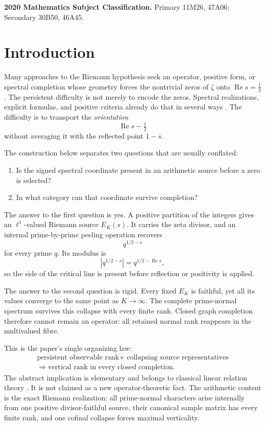 \documentclass[11pt]{article}
\theoremstyle{definition}
\theoremstyle{remark}
\newcommand{\Rea}{\operatorname{Re}}
\begin{document}
\medskip
\noindent\textbf{2020 Mathematics Subject Classification.}
Primary 11M26, 47A06; Secondary 30B50, 46A45.

\section{Introduction}

Many approaches to the Riemann hypothesis seek an operator, positive form, or
spectral completion whose geometry forces the nontrivial zeros of
\(\zeta\) onto \(\Rea s=\tfrac12\).  The persistent difficulty is not merely
to encode the zeros.  Spectral realizations, explicit formulas, and positive
criteria already do that in several ways
\cite{Connes1999,Meyer2005,ConnesConsani2021,Hedenmalm2026,Suzuki2026}.
The difficulty is to transport the \emph{orientation}
\[
                              \Rea s-\tfrac12
\]
without averaging it with the reflected point \(1-\overline{s}\).

The construction below separates two questions that are usually conflated:

\begin{enumerate}[leftmargin=2.1em]
\item Is the signed spectral coordinate present in an arithmetic source before
      a zero is selected?
\item In what category can that coordinate survive completion?
\end{enumerate}

The answer to the first question is yes.  A positive partition of the integers
gives an \(\ell^1\)-valued Riemann source \(E_K(s)\).  It carries the zeta
divisor, and an internal prime-by-prime peeling operation recovers
\[
                              q^{1/2-s}
\tag{1.1}\label{eq:normal-character}
\]
for every prime \(q\).  Its modulus is
\[
                    |q^{1/2-s}|=q^{1/2-\Rea s},
\tag{1.2}\label{eq:orientation-modulus}
\]
so the side of the critical line is present before reflection or positivity is
applied.

The answer to the second question is rigid.  Every fixed \(E_K\) is faithful,
yet all its values converge to the same point as \(K\to\infty\).  The complete
prime-normal spectrum survives this collapse with every finite rank.  Closed
graph completion therefore cannot remain an operator: all retained normal
rank reappears in the multivalued fibre.

This is the paper's single organizing law:
\[
\boxed{
\begin{gathered}
\text{persistent observable rank}
   +\text{ collapsing source representatives}\\
\Longrightarrow
\text{vertical rank in every closed completion}.
\end{gathered}}
\tag{1.3}\label{eq:rank-transmutation}
\]
The abstract implication is elementary and belongs to classical linear
relation theory \cite{Arens1961,HassiDeSnooSzafraniec2009}.  It is not claimed
as a new operator-theoretic fact.  The arithmetic content is the exact
Riemann realization: all prime-normal characters arise internally from one
positive divisor-faithful source, their canonical sample matrix has every
finite rank, and one cofinal collapse forces maximal verticality.
\end{document}
